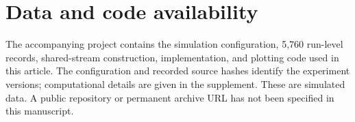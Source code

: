 \section*{Data and code availability}
The accompanying project contains the simulation configuration, 5,760
run-level records, shared-stream construction, implementation, and
plotting code used in this article. The configuration and recorded source
hashes identify the experiment versions; computational details are given
in the supplement. These are simulated data. A public repository or
permanent archive URL has not been specified in this manuscript.





